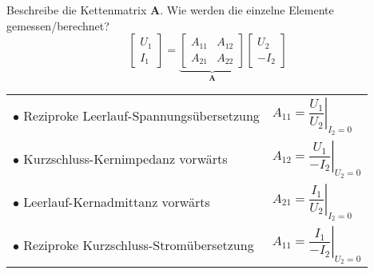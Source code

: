 \begin{karte}{Beschreibe die Kettenmatrix $\mathbf{A}$. Wie werden die einzelne Elemente gemessen/berechnet?\\
		\begin{equation*}
		\left[\begin{array}{c}
		U_1 \\ I_1
		\end{array}\right]
		= 
		\underbrace{\left[\begin{array}{cc}
			A_{11} & A_{12}\\
			A_{21} & A_{22}
			\end{array}\right]}_{\mathbf{A}}
		\left[\begin{array}{c}
		U_2 \\ -I_2
		\end{array}\right]
		\end{equation*}}
	\renewcommand*{\arraystretch}{2.2}
	{\small
	\begin{tabular}{ll}	
		$\bullet$ Reziproke Leerlauf-Spannungsübersetzung & $A_{11} = \left.\dfrac{U_1}{U_2}\right|_{I_2=0}$\\
		$\bullet$ Kurzschluss-Kernimpedanz vorwärts & $A_{12} = \left.\dfrac{U_1}{-I_2}\right|_{U_2=0}$\\
		$\bullet$ Leerlauf-Kernadmittanz vorwärts & $A_{21} = \left.\dfrac{I_1}{U_2}\right|_{I_2=0}$\\
		$\bullet$ Reziproke Kurzschluss-Stromübersetzung & $A_{11} = \left.\dfrac{I_1}{-I_2}\right|_{U_2=0}$\\
	\end{tabular}
	}
\end{karte}

